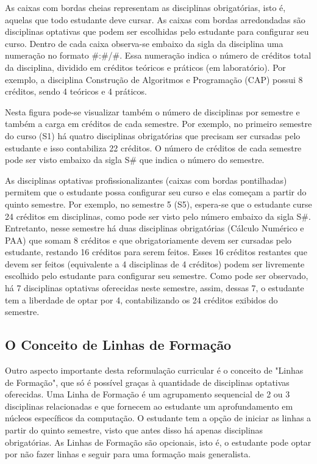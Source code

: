 As caixas com bordas cheias representam as disciplinas obrigatórias, isto é, aquelas que todo estudante deve cursar. As caixas com bordas arredondadas são disciplinas optativas que podem ser escolhidas pelo estudante para configurar seu curso. Dentro de cada caixa observa-se embaixo da sigla da disciplina uma numeração no formato \#:\#/\#. Essa numeração indica o número de créditos total da disciplina, dividido em créditos teóricos e práticos (em laboratório). Por exemplo, a disciplina Construção de Algoritmos e Programação (CAP) possui 8 créditos, sendo 4 teóricos e 4 práticos. 

Nesta figura pode-se visualizar também o número de disciplinas por semestre e também a carga em créditos de cada semestre. Por exemplo, no primeiro semestre do curso (S1) há quatro disciplinas obrigatórias que precisam ser cursadas pelo estudante e isso contabiliza 22 créditos. O número de créditos de cada semestre pode ser visto embaixo da sigla S\# que indica o número do semestre.

As disciplinas optativas profissionalizantes (caixas com bordas pontilhadas) permitem que o estudante possa configurar seu curso e elas começam a partir do quinto semestre. Por exemplo, no semestre 5 (S5), espera-se que o estudante curse 24 créditos em disciplinas, como pode ser visto pelo número embaixo da sigla S\#. Entretanto, nesse semestre há duas disciplinas obrigatórias (Cálculo Numérico e PAA) que somam 8 créditos e que obrigatoriamente devem ser cursadas pelo estudante, restando 16 créditos para serem feitos. Esses 16 créditos restantes que devem ser feitos (equivalente a 4 disciplinas de 4 créditos) podem ser livremente escolhido pelo estudante para configurar seu semestre. Como pode ser observado, há 7 disciplinas optativas oferecidas neste semestre, assim, dessas 7, o estudante tem a liberdade de optar por 4, contabilizando os 24 créditos exibidos do semestre. 


\subsection{O Conceito de Linhas de Formação}

Outro aspecto importante desta reformulação curricular é o conceito de "Linhas de Formação", que só é possível graças à quantidade de disciplinas optativas oferecidas. Uma Linha de Formação é um agrupamento sequencial de 2 ou 3 disciplinas relacionadas e que fornecem ao estudante um aprofundamento em núcleos específicos da computação. O estudante tem a opção de iniciar as linhas a partir do quinto semestre, visto que antes disso há apenas disciplinas obrigatórias. As Linhas de Formação são opcionais, isto é, o estudante pode optar por não fazer linhas e seguir para uma formação mais generalista.  

